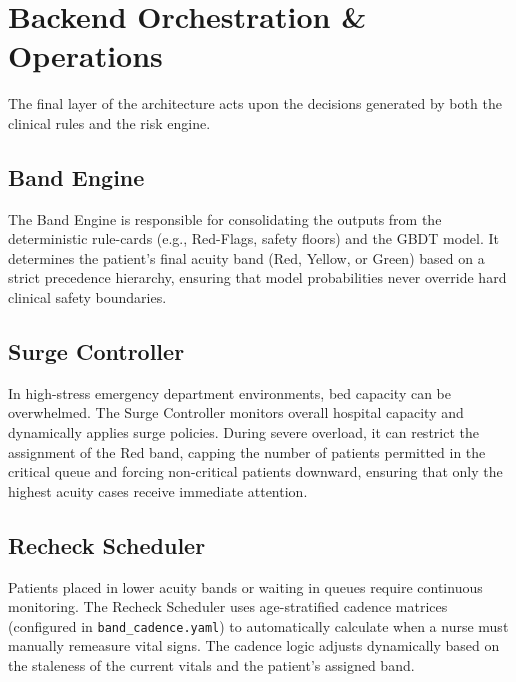 \section{Backend Orchestration \& Operations}

The final layer of the architecture acts upon the decisions generated by both the clinical rules and the risk engine.

\subsection{Band Engine}
The Band Engine is responsible for consolidating the outputs from the deterministic rule-cards (e.g., Red-Flags, safety floors) and the GBDT model. It determines the patient's final acuity band (Red, Yellow, or Green) based on a strict precedence hierarchy, ensuring that model probabilities never override hard clinical safety boundaries.

\subsection{Surge Controller}
In high-stress emergency department environments, bed capacity can be overwhelmed. The Surge Controller monitors overall hospital capacity and dynamically applies surge policies. During severe overload, it can restrict the assignment of the Red band, capping the number of patients permitted in the critical queue and forcing non-critical patients downward, ensuring that only the highest acuity cases receive immediate attention.

\subsection{Recheck Scheduler}
Patients placed in lower acuity bands or waiting in queues require continuous monitoring. The Recheck Scheduler uses age-stratified cadence matrices (configured in \texttt{band\_cadence.yaml}) to automatically calculate when a nurse must manually remeasure vital signs. The cadence logic adjusts dynamically based on the staleness of the current vitals and the patient's assigned band.
